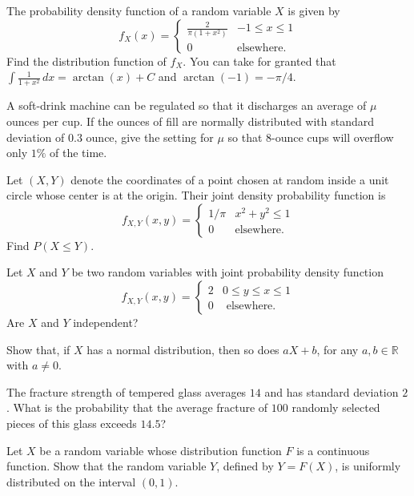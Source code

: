 \documentclass[addpoints, 12pt]{exam}%
\newcommand{\bR}{\mathbb{R}}
\theoremstyle{definition}
\begin{document}
\begin{questions}

\question[10]
The probability density function of a random variable $X$ is given by
  \[
    f_X (x) = \left\lbrace \begin{matrix} \frac{2}{\pi (1 + x^2 )} & -1 \leq x \leq 1 \\ 
    0 & \text{elsewhere.} \end{matrix} \right.
  \]
Find the distribution function of $f_X$. You can take for granted that $\int \frac{1}{1 + x^2} \, dx = \arctan (x) + C$ and $\arctan (-1) = -\pi/4$.

\newpage 

\question[20]
A soft-drink machine can be regulated so that it discharges an average of $\mu$ ounces per cup. If the ounces of fill are normally distributed with standard deviation of $0.3$ ounce, give the setting for $\mu$ so that $8$-ounce cups will overflow only $1\%$ of the time.
\newpage 

\question[10] 
Let $(X, Y)$ denote the coordinates of a point chosen at random inside a unit circle whose center is at the origin. Their joint density probability function is
  \[
    f_{X, Y} (x, y) = \left\lbrace \begin{matrix} 1/\pi & x^2 + y^2 \leq 1 \\ 0 & \text{elsewhere.} \end{matrix} \right.
  \]
Find $P (X \leq Y)$.
\newpage 

\question[20] 
Let $X$ and $Y$ be two random variables with joint probability density function
  \[
    f_{X, Y} (x, y) = \left\lbrace \begin{matrix} 2 & 0 \leq y \leq x \leq 1 \\ 0 & \text{ elsewhere.} \end{matrix} \right. 
  \]
Are $X$ and $Y$ independent?

\newpage

\question[10]
Show that, if $X$ has a normal distribution, then so does $aX + b$, for any $a, b \in \bR$ with $a \neq 0$.

\vspace*{10cm}

\question[20]
The fracture strength of tempered glass averages $14$ and has standard deviation $2$. What is the probability that the average fracture of $100$ randomly selected pieces of this glass exceeds $14.5$?


\newpage 

\question[10]
Let $X$ be a random variable whose distribution function $F$ is a continuous function. Show that the random variable $Y$, defined by $Y = F (X)$, is uniformly distributed on the interval $(0, 1)$. 

\newpage 

\phantom{2}

\end{questions}
\end{document}

